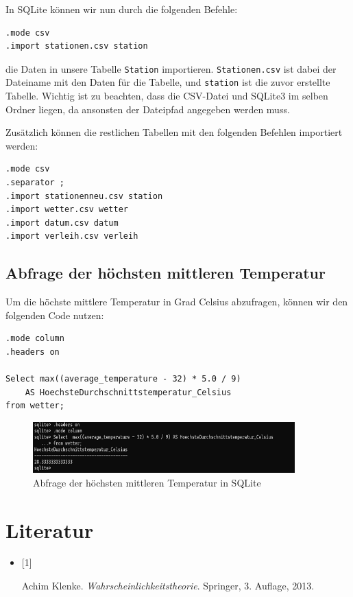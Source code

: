 \documentclass{article}
\begin{document}
In SQLite können wir nun durch die folgenden Befehle:

\begin{verbatim}
.mode csv
.import stationen.csv station
\end{verbatim}

die Daten in unsere Tabelle \texttt{Station} importieren. \texttt{Stationen.csv} ist dabei der Dateiname mit den Daten für die Tabelle, und \texttt{station} ist die zuvor erstellte Tabelle. Wichtig ist zu beachten, dass die CSV-Datei und SQLite3 im selben Ordner liegen, da ansonsten der Dateipfad angegeben werden muss.

Zusätzlich können die restlichen Tabellen mit den folgenden Befehlen importiert werden:

\begin{verbatim}
.mode csv
.separator ;
.import stationenneu.csv station
.import wetter.csv wetter
.import datum.csv datum
.import verleih.csv verleih
\end{verbatim}

\newpage 
\newpage 

\subsection{Abfrage der höchsten mittleren Temperatur}
\label{sec:highest-temp-query}

Um die höchste mittlere Temperatur in Grad Celsius abzufragen, können wir den folgenden Code nutzen:

\begin{verbatim}
.mode column
.headers on

Select max((average_temperature - 32) * 5.0 / 9) 
    AS HoechsteDurchschnittstemperatur_Celsius
from wetter;
\end{verbatim}

\begin{figure}[h!]
    \centering
    \includegraphics[width=0.9\textwidth]{letztes b.png}
    \caption{Abfrage der höchsten mittleren Temperatur in SQLite}
    \label{fig:highest-temp-query}
\end{figure}

\newpage 


\section*{Literatur}
\begin{itemize}
    \item \hypertarget{litref}{[1]} Achim Klenke. \textit{Wahrscheinlichkeitstheorie}. Springer, 3. Auflage, 2013.
\end{itemize}
\end{document}
